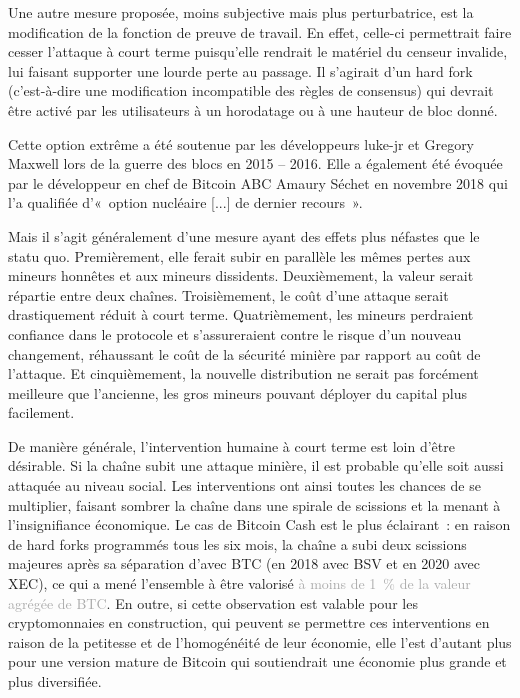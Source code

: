 
Une autre mesure proposée, moins subjective mais plus perturbatrice, est la modification de la fonction de preuve de travail. En effet, celle-ci permettrait faire cesser l'attaque à court terme puisqu'elle rendrait le matériel du censeur invalide, lui faisant supporter une lourde perte au passage. Il s'agirait d'un hard fork (c'est-à-dire une modification incompatible des règles de consensus) qui devrait être activé par les utilisateurs à un horodatage ou à une hauteur de bloc donné.

Cette option extrême a été soutenue par les développeurs luke-jr et Gregory Maxwell lors de la guerre des blocs en 2015 -- 2016. Elle a également été évoquée par le développeur en chef de Bitcoin ABC Amaury Séchet en novembre 2018 qui l'a qualifiée d'«~option nucléaire [...] de dernier recours~».

Mais il s'agit généralement d'une mesure ayant des effets plus néfastes que le statu quo. Premièrement, elle ferait subir en parallèle les mêmes pertes aux mineurs honnêtes et aux mineurs dissidents. Deuxièmement, la valeur serait répartie entre deux chaînes. Troisièmement, le coût d'une attaque serait drastiquement réduit à court terme. Quatrièmement, les mineurs perdraient confiance dans le protocole et s'assureraient contre le risque d'un nouveau changement, réhaussant le coût de la sécurité minière par rapport au coût de l'attaque. Et cinquièmement, la nouvelle distribution ne serait pas forcément meilleure que l'ancienne, les gros mineurs pouvant déployer du capital plus facilement.

De manière générale, l'intervention humaine à court terme est loin d'être désirable. Si la chaîne subit une attaque minière, il est probable qu'elle soit aussi attaquée au niveau social. Les interventions ont ainsi toutes les chances de se multiplier, faisant sombrer la chaîne dans une spirale de scissions et la menant à l'insignifiance économique. Le cas de Bitcoin Cash est le plus éclairant~: en raison de hard forks programmés tous les six mois, la chaîne a subi deux scissions majeures après sa séparation d'avec BTC (en 2018 avec BSV et en 2020 avec XEC), ce qui a mené l'ensemble à être valorisé \textcolor{darkgray}{à moins de 1~\% de la valeur agrégée de BTC}. En outre, si cette observation est valable pour les cryptomonnaies en construction, qui peuvent se permettre ces interventions en raison de la petitesse et de l'homogénéité de leur économie, elle l'est d'autant plus pour une version mature de Bitcoin qui soutiendrait une économie plus grande et plus diversifiée.

